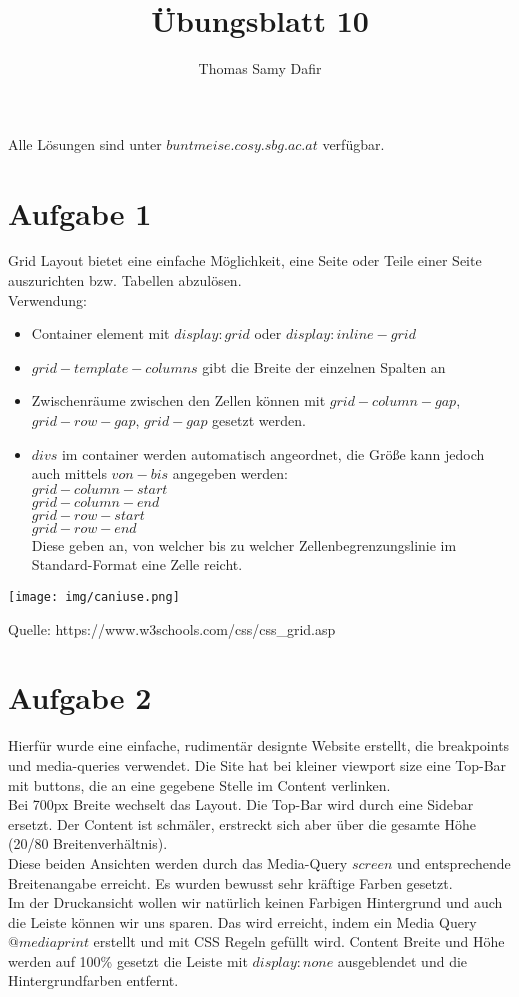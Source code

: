 \documentclass[12pt, a4paper]{report}
\title{Übungsblatt 10}
\author{Thomas Samy Dafir}
\date{}
\begin{document}
\maketitle

Alle Lösungen sind unter $buntmeise.cosy.sbg.ac.at$ verfügbar.

\section*{Aufgabe 1}
Grid Layout bietet eine einfache Möglichkeit, eine Seite oder Teile einer Seite auszurichten bzw. Tabellen abzulösen.\\
Verwendung:\\
\begin{itemize}
	\item Container element mit $display: grid$ oder $display: inline-grid$
	\item $grid-template-columns$ gibt die Breite der einzelnen Spalten an
	\item Zwischenräume zwischen den Zellen können mit $grid-column-gap$, $grid-row-gap$, $grid-gap$ gesetzt werden.
	\item $divs$ im container werden automatisch angeordnet, die Größe kann jedoch auch mittels $von-bis$ angegeben werden:\\
	$grid-column-start$\\
	$grid-column-end$\\
	$grid-row-start$\\
	$grid-row-end$\\
	Diese geben an, von welcher bis zu welcher Zellenbegrenzungslinie im Standard-Format eine Zelle reicht.
\end{itemize}

\texttt{[image: img/caniuse.png]}

Quelle: https://www.w3schools.com/css/css\_grid.asp

\section*{Aufgabe 2}
Hierfür wurde eine einfache, rudimentär designte Website erstellt, die breakpoints und media-queries verwendet.
Die Site hat bei kleiner viewport size eine Top-Bar mit buttons, die an eine gegebene Stelle im Content verlinken.\\
Bei 700px Breite wechselt das Layout. Die Top-Bar wird durch eine Sidebar ersetzt. Der Content ist schmäler, erstreckt sich aber über die gesamte Höhe (20/80 Breitenverhältnis).\\
Diese beiden Ansichten werden durch das Media-Query $screen$ und entsprechende Breitenangabe erreicht. Es wurden bewusst sehr kräftige Farben gesetzt.\\
Im der Druckansicht wollen wir natürlich keinen Farbigen Hintergrund und auch die Leiste können wir uns sparen. Das wird erreicht, indem ein Media Query $@media print$ erstellt und mit CSS Regeln gefüllt wird. Content Breite und Höhe werden auf 100\% gesetzt die Leiste mit $display: none$ ausgeblendet und die Hintergrundfarben entfernt.
\end{document}
